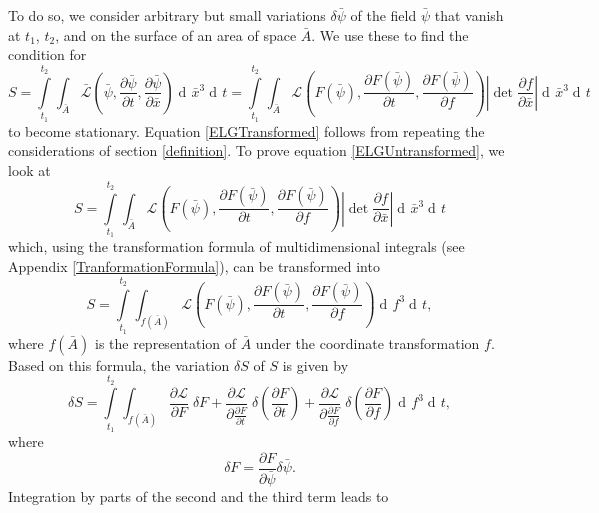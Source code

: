 \documentclass[prb,preprint]{revtex4-1}
\DeclareMathOperator{\dd}{d\!}
\begin{document}
To do so, we consider arbitrary but small variations $\delta \bar{\psi}$ of the field $\bar{\psi}$ that vanish at $t_1$, $t_2$, and on the surface of an area of space $\bar{A}$. We use these to find the condition for  
\begin{equation}
S = \int\limits_{t_1}^{t_2} \int_{\bar{A}} \bar{\mathcal{L}}\left(\bar{\psi}, \frac{\partial \bar{\psi}}{\partial t}, \frac{\partial \bar{\psi}}{\partial \bar{x}}\right) \dd \bar{x}^3 \dd t 
= \int\limits_{t_1}^{t_2} \int_{\bar{A}} \mathcal{L}\left(F(\bar{\psi}), \frac{\partial F(\bar{\psi})}{\partial t}, \frac{\partial F(\bar{\psi})}{\partial f}\right) 
\left| \det \frac{\partial f}{\partial \bar{x}} \right| \dd \bar{x}^3 \dd t 
\end{equation}
to become stationary. 
Equation \eqref{ELGTransformed} follows from repeating the considerations of section \ref{definition}.
To prove equation \eqref{ELGUntransformed}, we look at
\begin{equation}
S = \int\limits_{t_1}^{t_2} \int_{\bar{A}} \mathcal{L}\left(F(\bar{\psi}), \frac{\partial F(\bar{\psi})}{\partial t}, \frac{\partial F(\bar{\psi})}{\partial f}\right) 
\left| \det \frac{\partial f}{\partial \bar{x}} \right| \dd \bar{x}^3 \dd t 
\end{equation}
which, using the transformation formula of multidimensional integrals (see Appendix \ref{TranformationFormula}), can be transformed into
\begin{equation}
S = \int\limits_{t_1}^{t_2} \int_{f(\bar{A})} \mathcal{L}\left(F(\bar{\psi}), \frac{\partial F(\bar{\psi})}{\partial t}, \frac{\partial F(\bar{\psi})}{\partial f}\right) 
\dd f^3 \dd t,
\end{equation}
where $f(\bar{A})$ is the representation of $\bar{A}$ under the coordinate transformation $f$.
Based on this formula, the variation $\delta S$ of $S$ is given by
\begin{equation}
\delta S = \int\limits_{t_1}^{t_2} \int_{f(\bar{A})} 
\frac{\partial \mathcal{L}}{\partial F} \; \delta F
+ \frac{\partial \mathcal{L}}{\partial \frac{\partial F}{\partial t}} \; \delta \left(\frac{\partial F}{\partial t}\right)
+ \frac{\partial \mathcal{L}}{\partial \frac{\partial F}{\partial f}} \; \delta \left(\frac{\partial F} {\partial f}\right)
\dd f^3 \dd t,
\end{equation}
where 
\begin{equation} \label{deltaFDefinition}
\delta F = \frac{\partial F}{\partial \bar{\psi}} \delta \bar{\psi}.
\end{equation}
Integration by parts of the second and the third term leads to
\end{document}
